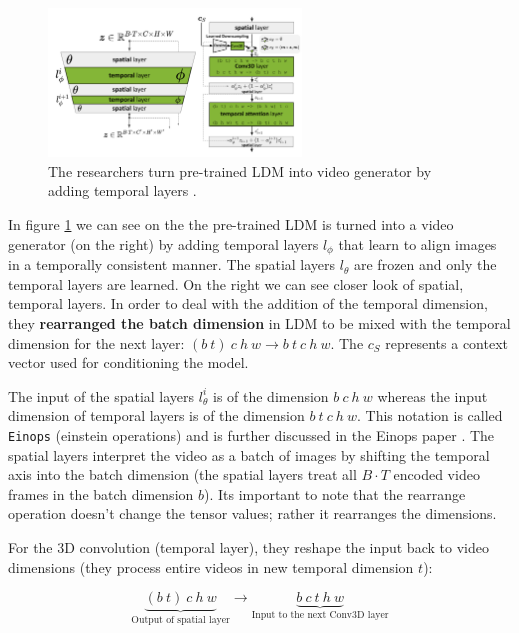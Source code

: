 \begin{figure}
    \centering
    \includegraphics[width=0.6\textwidth]{images/video_ldm/temporal_layers.png}
    \caption{The researchers turn pre-trained LDM into video generator by adding temporal layers \cite{video_ldm}.}
    \label{fig:video_ldm_spatial_temporal_mixing_layers}
\end{figure}

In figure \ref{fig:video_ldm_spatial_temporal_mixing_layers} we can see on the the pre-trained LDM is turned into a video generator (on the right) by adding temporal layers $l_\phi$ that learn to align images in a temporally consistent manner. The spatial layers $l_\theta$ are frozen and only the temporal layers are learned. On the right we can see closer look of spatial, temporal layers. In order to deal with the addition of the temporal dimension, they \textbf{rearranged the batch dimension} in LDM to be mixed with the temporal dimension for the next layer: $(b\ t)\ c\ h\ w \rightarrow b\ t\ c\ h\ w$. The $c_S$ represents a context vector used for conditioning the model.

The input of the spatial layers $l_\theta^i$ is of the dimension $b\ c\ h\ w$ whereas the input dimension of temporal layers is of the dimension $b\ t\ c\ h\ w$. This notation is called \texttt{Einops} (einstein operations) and is further discussed in the Einops paper \cite{einops}. The spatial layers interpret the video as a batch of images by shifting the temporal axis into the batch dimension (the spatial layers treat all $B \cdot T$ encoded video frames in the batch dimension $b$). Its important to note that the rearrange operation doesn't change the tensor values; rather it rearranges the dimensions.

For the 3D convolution (temporal layer), they reshape the input back to video dimensions (they process entire videos in new temporal dimension $t$): 

\[ \underbrace{(b\ t)\ c\ h\ w}_{\text{Output of spatial layer}} \rightarrow \underbrace{b\ c\ t\ h\ w}_{\text{Input to the next Conv3D layer}} \]

